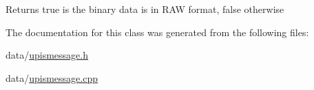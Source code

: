 \begin{DoxyReturn}{Returns}
true is the binary data is in RAW format, false otherwise 
\end{DoxyReturn}


The documentation for this class was generated from the following files:\begin{DoxyCompactItemize}
\item 
data/\hyperlink{upismessage_8h}{upismessage.h}\item 
data/\hyperlink{upismessage_8cpp}{upismessage.cpp}\end{DoxyCompactItemize}
